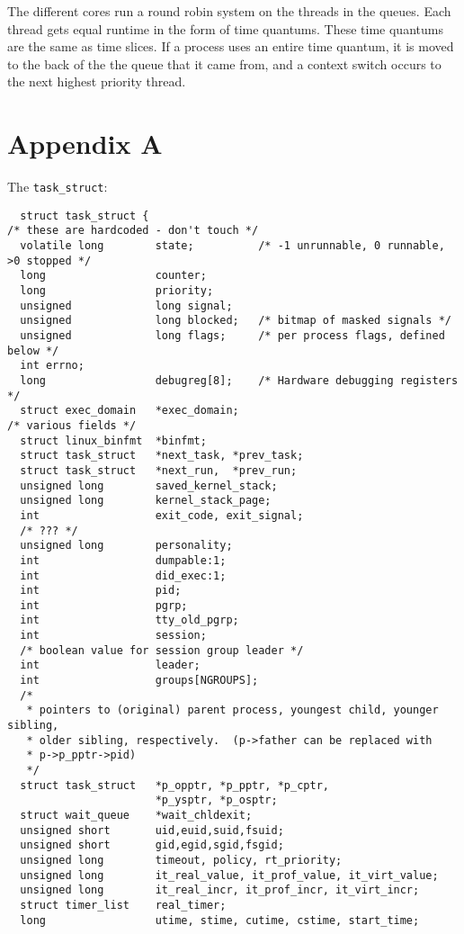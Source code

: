 The different cores run a round robin system on the threads in the queues. Each
thread gets equal runtime in the form of time quantums. These time quantums are
the same as time slices. If a process uses an entire time quantum, it is moved
to the back of the the queue that it came from, and a context switch occurs to the
next highest priority thread.\cite{kirkgeorgebsd}
\clearpage
\section{Appendix A}
The \texttt{task\_struct}:\cite{linustorvalds2016}
\begin{lstlisting}
  struct task_struct {
/* these are hardcoded - don't touch */
  volatile long        state;          /* -1 unrunnable, 0 runnable, >0 stopped */
  long                 counter;
  long                 priority;
  unsigned             long signal;
  unsigned             long blocked;   /* bitmap of masked signals */
  unsigned             long flags;     /* per process flags, defined below */
  int errno;
  long                 debugreg[8];    /* Hardware debugging registers */
  struct exec_domain   *exec_domain;
/* various fields */
  struct linux_binfmt  *binfmt;
  struct task_struct   *next_task, *prev_task;
  struct task_struct   *next_run,  *prev_run;
  unsigned long        saved_kernel_stack;
  unsigned long        kernel_stack_page;
  int                  exit_code, exit_signal;
  /* ??? */
  unsigned long        personality;
  int                  dumpable:1;
  int                  did_exec:1;
  int                  pid;
  int                  pgrp;
  int                  tty_old_pgrp;
  int                  session;
  /* boolean value for session group leader */
  int                  leader;
  int                  groups[NGROUPS];
  /*
   * pointers to (original) parent process, youngest child, younger sibling,
   * older sibling, respectively.  (p->father can be replaced with
   * p->p_pptr->pid)
   */
  struct task_struct   *p_opptr, *p_pptr, *p_cptr,
                       *p_ysptr, *p_osptr;
  struct wait_queue    *wait_chldexit;
  unsigned short       uid,euid,suid,fsuid;
  unsigned short       gid,egid,sgid,fsgid;
  unsigned long        timeout, policy, rt_priority;
  unsigned long        it_real_value, it_prof_value, it_virt_value;
  unsigned long        it_real_incr, it_prof_incr, it_virt_incr;
  struct timer_list    real_timer;
  long                 utime, stime, cutime, cstime, start_time;

\end{lstlisting}
